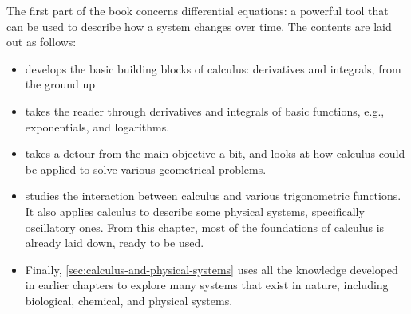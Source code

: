 The first part of the book concerns differential equations: a powerful tool that can be used to describe how a system changes over time. The contents are laid out as follows:
\begin{itemize}
	\item {} develops the basic building blocks of calculus: derivatives and integrals, from the ground up
	\item {} takes the reader through derivatives and integrals of basic functions, e.g., exponentials, and logarithms.
	\item {} takes a detour from the main objective a bit, and looks at how calculus could be applied to solve various geometrical problems.
	\item {} studies the interaction between calculus and various trigonometric functions. It also applies calculus to describe some physical systems, specifically oscillatory ones. From this chapter, most of the foundations of calculus is already laid down, ready to be used.
	\item Finally, \cref{sec:calculus-and-physical-systems} uses all the knowledge developed in earlier chapters to explore many systems that exist in nature, including biological, chemical, and physical systems.
\end{itemize}
